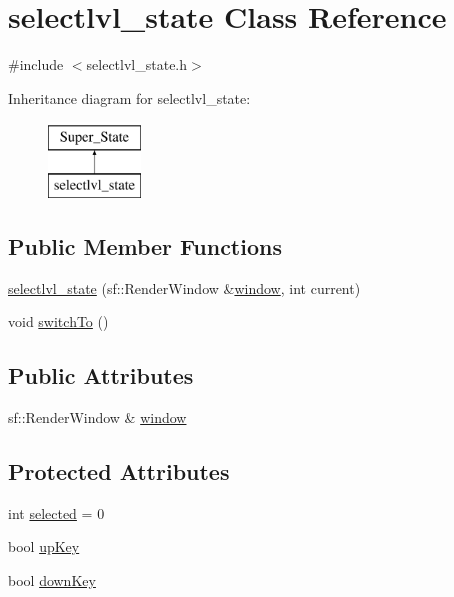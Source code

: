 \hypertarget{classselectlvl__state}{}\section{selectlvl\+\_\+state Class Reference}
\label{classselectlvl__state}


{\ttfamily \#include $<$selectlvl\+\_\+state.\+h$>$}

Inheritance diagram for selectlvl\+\_\+state\+:\begin{figure}[H]
\begin{center}
\leavevmode
\includegraphics[height=2.000000cm]{classselectlvl__state}
\end{center}
\end{figure}
\subsection*{Public Member Functions}
\begin{DoxyCompactItemize}
\item 
\hyperlink{classselectlvl__state_aa346a0911b033538037fdd4f11258cf3}{selectlvl\+\_\+state} (sf\+::\+Render\+Window \&\hyperlink{classselectlvl__state_adc49d09d9d1fee70b893edf520f672f0}{window}, int current)
\item 
void \hyperlink{classselectlvl__state_a73150e2cbfe869b038d28bebfaf3c8b7}{switch\+To} ()
\end{DoxyCompactItemize}
\subsection*{Public Attributes}
\begin{DoxyCompactItemize}
\item 
sf\+::\+Render\+Window \& \hyperlink{classselectlvl__state_adc49d09d9d1fee70b893edf520f672f0}{window}
\end{DoxyCompactItemize}
\subsection*{Protected Attributes}
\begin{DoxyCompactItemize}
\item 
int \hyperlink{classselectlvl__state_a1aa7f8e42e33438122360815a25132fd}{selected} = 0
\item 
bool \hyperlink{classselectlvl__state_aa4324e54a3512a3f62d19e9dc9edff3a}{up\+Key}
\item 
bool \hyperlink{classselectlvl__state_aef788a1fc2fa8b84eaace4cdc95dfee9}{down\+Key}
\end{DoxyCompactItemize}


